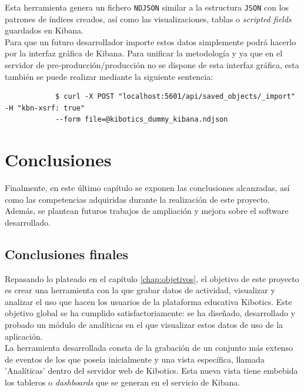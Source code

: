 \documentclass[a4paper, 12pt]{book}
\begin{document}
		Esta herramienta genera un fichero \texttt{NDJSON} similar a la estructura \texttt{JSON} con los patrones de índices creados, así como las visualizaciones, tablas o \textit{scripted fields} guardados en Kibana.\\
		
		Para que un futuro desarrollador importe estos datos simplemente podrá hacerlo por la interfaz gráfica de Kibana. Para unificar la metodología y ya que en el servidor de pre-producción/producción no se dispone de esta interfaz gráfica, esta también se puede realizar mediante la siguiente sentencia:\\
		
		
		{\footnotesize
		\begin{verbatim}
			$ curl -X POST "localhost:5601/api/saved_objects/_import" -H "kbn-xsrf: true" 
			--form file=@kibotics_dummy_kibana.ndjson
		\end{verbatim}
		}


	\cleardoublepage 
	\chapter{Conclusiones} 
	\label{chap:conclusiones} 
		Finalmente, en este último capítulo se exponen las conclusiones alcanzadas, así como las competencias adquiridas durante la realización de este proyecto. Además, se plantean futuros trabajos de ampliación y mejora sobre el software desarrollado.
	
	\section{Conclusiones finales} 
	\label{sec:conclusiones_finales} 

		Repasando lo plateado en el capítulo \ref{chap:objetivos}, el objetivo de este proyecto es crear una herramienta con la que grabar datos de actividad, visualizar y analizar el uso que hacen los usuarios de la plataforma educativa Kibotics. Este objetivo global se ha cumplido satisfactoriamente: se ha diseñado, desarrollado y probado un módulo de analíticas en el que visualizar estos datos de uso de la aplicación.\\
		
		La herramienta desarrollada consta de la grabación de un conjunto más extenso de eventos de los que poseía inicialmente y una vista específica, llamada 'Analíticas' dentro del servidor web de Kibotics. Esta nueva vista tiene embebida los tableros o \textit{dashboards} que se generan en el servicio de Kibana.\\
		
\end{document}
